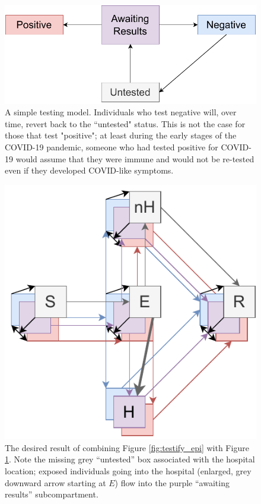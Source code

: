 \documentclass{article}
\theoremstyle{definition}
\begin{document}
\begin{figure}
    \centering
    \includegraphics[width=\textwidth]{images_pdf/Testing.pdf}
    \caption{A simple testing model. Individuals who test negative will, over time, revert back to the “untested" status. This is not the case for those that test "positive"; at least during the early stages of the COVID-19 pandemic, someone who had tested positive for COVID-19 would assume that they were immune and would not be re-tested even if they developed COVID-like symptoms.}
    \label{fig:testify_states}
\end{figure}

\begin{figure}
    \centering
    \includegraphics[width=\textwidth]{images_pdf/SIR_w_Hospital_and_Testing.pdf}
    \caption{The desired result of combining Figure \ref{fig:testify_epi} with Figure \ref{fig:testify_states}. Note the missing grey ``untested'' box associated with the hospital location; exposed individuals going into the hospital (enlarged, grey downward arrow starting at $E$) flow into the purple ``awaiting results'' subcompartment.}
    \label{fig:testify_desired}
\end{figure}
\end{document}
